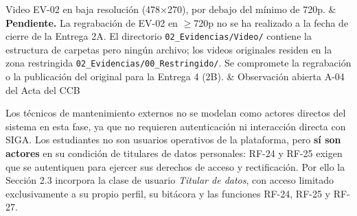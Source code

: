 %
%

Video EV-02 en baja resoluci\'on (478$\times$270), por debajo del m\'inimo de 720p.
& \textbf{Pendiente.} La regrabaci\'on de EV-02 en $\geq$720p no se ha realizado a la fecha de cierre de la Entrega 2A. El directorio \texttt{02\_Evidencias/Video/} contiene la estructura de carpetas pero ning\'un archivo; los videos originales residen en la zona restringida \texttt{02\_Evidencias/00\_Restringido/}. Se compromete la regrabaci\'on o la publicaci\'on del original para la Entrega 4 (2B).
& Observaci\'on abierta A-04 del Acta del CCB \\ \hline

Los t\'ecnicos de mantenimiento externos no se modelan como actores directos del sistema en esta fase, ya que no requieren autenticaci\'on ni interacci\'on directa con SIGA. Los estudiantes no son usuarios operativos de la plataforma, pero \textbf{s\'i son actores} en su condici\'on de titulares de datos personales: RF-24 y RF-25 exigen que se autentiquen para ejercer sus derechos de acceso y rectificaci\'on. Por ello la Secci\'on 2.3 incorpora la clase de usuario \emph{Titular de datos}, con acceso limitado exclusivamente a su propio perfil, su bit\'acora y las funciones RF-24, RF-25 y RF-27.

